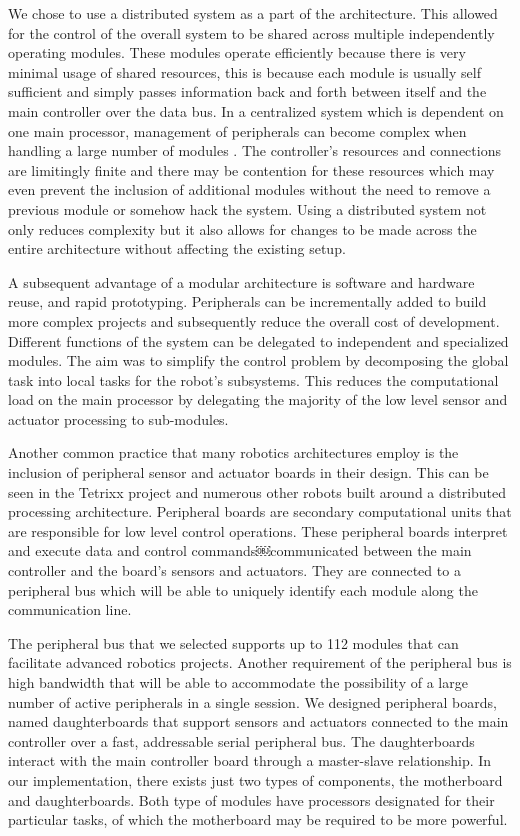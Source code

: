 We chose to use a distributed system as a part of the architecture. This allowed for the control of the overall system to be shared across multiple independently operating modules. These modules operate efficiently because there is very minimal usage of shared resources, this is because each module is usually self sufficient and simply passes information back and forth between itself and the main controller over the data bus.\cite{show figure} In a centralized system which is dependent on one main processor, management of peripherals can become complex when handling a large number of modules \cite{centralized figure}. The controller's resources and connections are limitingly finite and there may be contention for these resources which may even prevent the inclusion of additional modules without the need to remove a previous module or somehow hack the system.  Using a distributed system not only reduces complexity but it also allows for changes to be made across the entire architecture without affecting the existing setup\cite{avcithesis}.

A subsequent advantage of a modular architecture is software and hardware reuse, and rapid prototyping. Peripherals can be incrementally added to build more complex projects and subsequently reduce the overall cost of development\cite{modcom}. Different functions of the system can be delegated to independent and specialized modules. The aim was to simplify the control problem by decomposing the global task into local tasks for the robot's subsystems\cite{paper[6]}. This reduces the computational load on the main processor by delegating the majority of the low level sensor and actuator processing to sub-modules. 

Another common practice that many robotics architectures employ is the inclusion of peripheral sensor and actuator boards in their design. This can be seen in the Tetrixx project \cite{tetrixx} and numerous other robots built around a distributed processing architecture. Peripheral boards are secondary computational units that are responsible for low level control operations. These peripheral boards interpret and execute data and control commands￼communicated between the main controller and the board's sensors and actuators. They are connected to a peripheral bus which will be able to uniquely identify each module along the communication line. 

The peripheral bus that we selected supports up to 112 modules that can facilitate advanced robotics projects. Another requirement of the peripheral bus is high bandwidth that will be able to accommodate the possibility of a large number of active peripherals in a single session. We designed peripheral boards, named daughterboards that support sensors and actuators connected to the main controller over a fast, addressable serial peripheral bus. The daughterboards interact with the main controller board through a master-slave relationship. In our implementation, there exists just two types of components, the motherboard and daughterboards. Both type of modules have processors designated for their particular tasks, of which the motherboard may be required to be more powerful.


